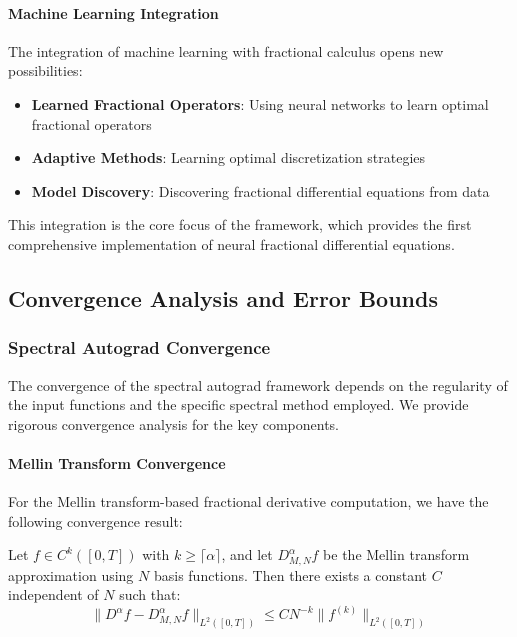 \paragraph{Machine Learning Integration}

The integration of machine learning with fractional calculus opens new possibilities:

\begin{itemize}
    \item \textbf{Learned Fractional Operators}: Using neural networks to learn optimal fractional operators
    \item \textbf{Adaptive Methods}: Learning optimal discretization strategies
    \item \textbf{Model Discovery}: Discovering fractional differential equations from data
\end{itemize}

This integration is the core focus of the \hpfracc framework, which provides the first comprehensive implementation of neural fractional differential equations.

\subsection{Convergence Analysis and Error Bounds}

\subsubsection{Spectral Autograd Convergence}

The convergence of the spectral autograd framework depends on the regularity of the input functions and the specific spectral method employed. We provide rigorous convergence analysis for the key components.

\paragraph{Mellin Transform Convergence}

For the Mellin transform-based fractional derivative computation, we have the following convergence result:

\begin{theorem}
Let $f \in C^k([0,T])$ with $k \geq \lceil \alpha \rceil$, and let $D^{\alpha}_{M,N} f$ be the Mellin transform approximation using $N$ basis functions. Then there exists a constant $C$ independent of $N$ such that:
\begin{equation}
\|D^{\alpha} f - D^{\alpha}_{M,N} f\|_{L^2([0,T])} \leq C N^{-k} \|f^{(k)}\|_{L^2([0,T])}
\end{equation}
\end{theorem}

